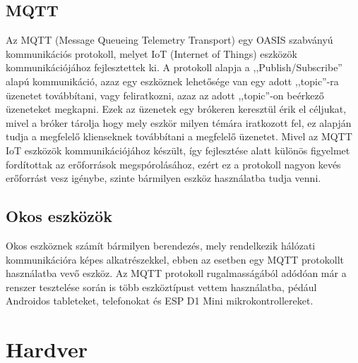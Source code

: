 \documentclass[
]{thesis-ekf}
\theoremstyle{definition}
\theoremstyle{remark}
\begin{document}
\section{MQTT}
Az MQTT (Message Queueing Telemetry Transport)\cite{mqtt} egy OASIS szabványú kommunikációs protokoll, 
melyet IoT (Internet of Things) eszközök kommunikációjához fejlesztettek ki. 
A protokoll alapja a ,,Publish/Subscribe'' alapú kommunikáció, azaz egy eszköznek lehetősége van egy adott ,,topic''-ra üzenetet továbbítani, 
vagy feliratkozni, azaz az adott ,,topic''-on beérkező üzeneteket megkapni. Ezek az üzenetek egy brókeren keresztül érik el céljukat, 
mivel a bróker tárolja hogy mely eszkör milyen témára iratkozott fel, ez alapján tudja a megfelelő klienseknek továbbítani a megfelelő üzenetet. 
Mivel az MQTT IoT eszközök kommunikációjához készült, így fejlesztése alatt különös figyelmet fordítottak az erőforrások megspórolásához, 
ezért ez a protokoll nagyon kevés erőforrást vesz igénybe, szinte bármilyen eszköz használatba tudja venni.

\section{Okos eszközök}
Okos eszköznek számít bármilyen berendezés, mely rendelkezik hálózati kommunikációra képes alkatrészekkel, 
ebben az esetben egy MQTT protokollt használatba vevő eszköz. Az MQTT protokoll rugalmasságából adódóan már a renszer tesztelése során is több eszköztípust 
vettem használatba, pédául Androidos tableteket, telefonokat és ESP D1 Mini mikrokontrollereket.

\chapter{Hardver}
\end{document}
